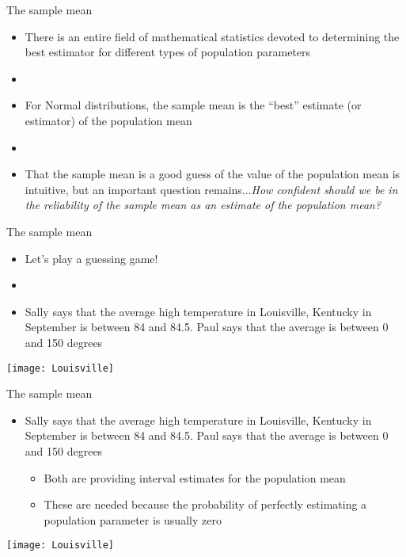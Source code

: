 \documentclass[xcolor=dvipsnames]{beamer}
\begin{document}
\begin{frame}{The sample mean}
	\begin{itemize}
		\item There is an entire field of mathematical statistics devoted to determining the best estimator for different types of population parameters \pause
		\item[]
		\item For Normal distributions, the sample mean is the ``best'' estimate (or estimator) of the population mean \pause
		\item[]
		\item That the sample mean is a good guess of the value of the population mean is intuitive, but an important question remains...\emph{How confident should we be in the reliability of the sample mean as an estimate of the population mean?}
	\end{itemize}
\end{frame}

\begin{frame}{The sample mean}
	\begin{itemize}
		\item Let's play a guessing game!
		\item[] 
		\item Sally says that the average high temperature in Louisville, Kentucky in September is between 84 and 84.5. Paul says that the average is between 0 and 150 degrees
	\end{itemize}
\begin{center}
	\texttt{[image: Louisville]}
\end{center}
\end{frame}

\begin{frame}{The sample mean}
	\begin{itemize}
		\item Sally says that the average high temperature in Louisville, Kentucky in September is between 84 and 84.5. Paul says that the average is between 0 and 150 degrees
		\begin{itemize}
					\item Both are providing interval estimates for the population mean
			\item These are needed because the probability of perfectly estimating a population parameter is usually zero
		\end{itemize}
	\end{itemize}
	\begin{center}
		\texttt{[image: Louisville]}
	\end{center}
\end{frame}
\end{document}
